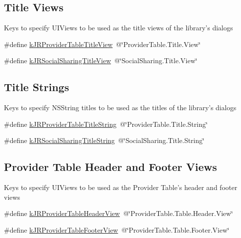 \subsection*{Title Views}
\label{_amgrp3aa85b42b54fc9202c3d403d77360bef}
 \label{group__custom_interface_titleViews}
\hypertarget{group__custom_interface_titleViews}{}


Keys to specify UIViews to be used as the title views of the library's dialogs \begin{DoxyCompactItemize}
\item 
\#define \hyperlink{group__custom_interface_ga0bce97edf43c9cdf53cbcd1aa92c4798}{kJRProviderTableTitleView}~@\char`\"{}ProviderTable.Title.View\char`\"{}
\item 
\#define \hyperlink{group__custom_interface_ga524965cf426f0eb9de4bcb804528c7f7}{kJRSocialSharingTitleView}~@\char`\"{}SocialSharing.Title.View\char`\"{}
\end{DoxyCompactItemize}
\subsection*{Title Strings}
\label{_amgrp57383e7526d006c80c9394d9945c0a3b}
 \label{group__custom_interface_titleStrings}
\hypertarget{group__custom_interface_titleStrings}{}


Keys to specify NSString titles to be used as the titles of the library's dialogs \begin{DoxyCompactItemize}
\item 
\#define \hyperlink{group__custom_interface_gaf728e45125be9ca6fa515a39a77e7ce7}{kJRProviderTableTitleString}~@\char`\"{}ProviderTable.Title.String\char`\"{}
\item 
\#define \hyperlink{group__custom_interface_ga8fb89469dc5225bf0ea4d1faca6aa2ab}{kJRSocialSharingTitleString}~@\char`\"{}SocialSharing.Title.String\char`\"{}
\end{DoxyCompactItemize}
\subsection*{Provider Table Header and Footer Views}
\label{_amgrp7070181e423f8bdc938527d6916a62cf}
 Keys to specify UIViews to be used as the Provider Table's header and footer views \begin{DoxyCompactItemize}
\item 
\#define \hyperlink{group__custom_interface_ga1a0f39bfdb880fdd0b8b39cbec492b6f}{kJRProviderTableHeaderView}~@\char`\"{}ProviderTable.Table.Header.View\char`\"{}
\item 
\#define \hyperlink{group__custom_interface_ga2b5c9162dd7701a552147ae1607a3b4d}{kJRProviderTableFooterView}~@\char`\"{}ProviderTable.Table.Footer.View\char`\"{}
\end{DoxyCompactItemize}
